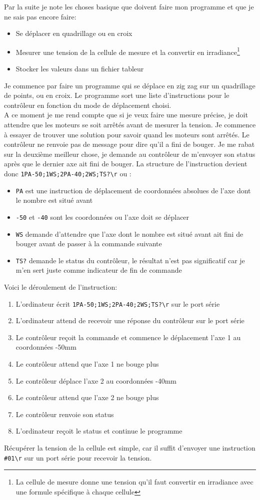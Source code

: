 \documentclass[12pt]{article}
\begin{document}
Par la suite je note les choses basique que doivent faire mon programme et que je ne sais pas encore faire:
\begin{itemize}
	\item Se déplacer en quadrillage ou en croix
	\item Mesurer une tension de la cellule de mesure et la convertir en irradiance\footnote{La cellule de mesure donne une tension qu'il faut convertir en irradiance avec une formule spécifique à chaque cellule}
	\item Stocker les valeurs dans un fichier tableur
\end{itemize}
Je commence par faire un programme qui se déplace en zig zag sur un quadrillage de points, ou en croix.
Le programme sort une liste d'instructions pour le contrôleur en fonction du mode de déplacement choisi.\\
A ce moment je me rend compte que si je veux faire une mesure précise, je doit attendre que les moteurs se soit arrêtés avant de mesurer la tension.
Je commence à essayer de trouver une solution pour savoir quand les moteurs sont arrêtés.
Le contrôleur ne renvoie pas de message pour dire qu'il a fini de bouger.
Je me rabat sur la deuxième meilleur chose, je demande au contrôleur de m'envoyer son status après que le dernier axe ait fini de bouger.
La structure de l'instruction devient donc \verb|1PA-50;1WS;2PA-40;2WS;TS?\r| ou :
\begin{itemize}
	\item \verb|PA| est une instruction de déplacement de coordonnées absolues de l'axe dont le nombre est situé avant
	\item \verb|-50| et \verb|-40| sont les coordonnées ou l'axe doit se déplacer
	\item \verb|WS| demande d'attendre que l'axe dont le nombre est situé avant ait fini de bouger avant de passer à la commande suivante
	\item \verb|TS?| demande le status du contrôleur, le résultat n'est pas significatif car je m'en sert juste comme indicateur de fin de commande
\end{itemize}
Voici le déroulement de l'instruction:
\begin{enumerate}
	\item L'ordinateur écrit \verb|1PA-50;1WS;2PA-40;2WS;TS?\r| sur le port série
	\item L'ordinateur attend de recevoir une réponse du contrôleur sur le port série
	\item Le contrôleur reçoit la commande et commence le déplacement l'axe 1 au coordonnées -50mm
	\item Le contrôleur attend que l'axe 1 ne bouge plus
	\item Le contrôleur déplace l'axe 2 au coordonnées -40mm
	\item Le contrôleur attend que l'axe 2 ne bouge plus
	\item Le contrôleur renvoie son status
	\item L'ordinateur reçoit le status et continue le programme
\end{enumerate}
Récupérer la tension de la cellule est simple, car il suffit d'envoyer une instruction \verb|#01\r| sur un port série pour recevoir la tension.
\end{document}
